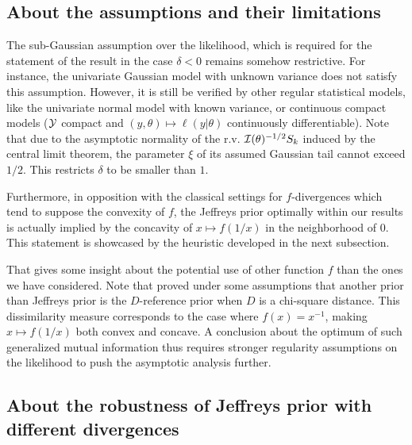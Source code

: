     \subsection{About the assumptions and their limitations}

    The sub-Gaussian assumption over the likelihood, which is required for the statement of the result in the case $\delta<0$
    remains somehow restrictive. For instance,
    the univariate Gaussian model with unknown variance does not satisfy this assumption. 
    However, it is still be verified by other regular statistical models, like the univariate normal model with known variance, or continuous compact models ($\mathcal{Y}$ compact and $(y,\theta)\mapsto\ell(y|\theta)$ continuously differentiable). {Note that due to the asymptotic normality of the r.v. $\mathcal{I}(\theta)^{-1/2}S_k$ induced by the central limit theorem, the parameter $\xi$ of its assumed Gaussian tail cannot exceed $1/2$. This restricts $\delta$ to be smaller than $1$.}

Furthermore, %
in opposition with the classical settings for $f$-divergences which tend to suppose the convexity of $f$, the Jeffreys prior optimally within our results is actually implied by the concavity of $x\mapsto f(1/x)$ in the neighborhood of $0$.
This statement is showcased by the heuristic developed in the next subsection.

That gives some insight about the potential use of other function $f$ than the ones we have considered.
Note that \citet{clarke_reference_1997} proved under some assumptions that another prior than Jeffreys prior is the $D$-reference prior when $D$ is a chi-square distance. This dissimilarity measure corresponds to the case where $f(x)=x^{-1}$, making $x\mapsto f(1/x)$ both convex and concave. 
A conclusion about the optimum of such generalized
mutual information thus requires stronger regularity assumptions on the likelihood to push
the asymptotic analysis further. %



    \subsection{About the robustness of Jeffreys prior with different divergences}


